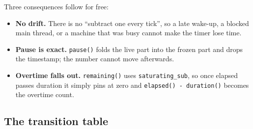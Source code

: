 Three consequences follow for free:

\begin{itemize}[leftmargin=1.4em,itemsep=0.3em]
  \item \textbf{No drift.} There is no ``subtract one every tick'', so a late wake-up, a
        blocked main thread, or a machine that was busy cannot make the timer lose time.
  \item \textbf{Pause is exact.} \texttt{pause()} folds the live part into the frozen part
        and drops the timestamp; the number cannot move afterwards.
  \item \textbf{Overtime falls out.} \texttt{remaining()} uses \texttt{saturating\_sub}, so
        once elapsed passes duration it simply pins at zero and
        \texttt{elapsed() - duration()} becomes the overtime count.
\end{itemize}

\subsection{The transition table}

